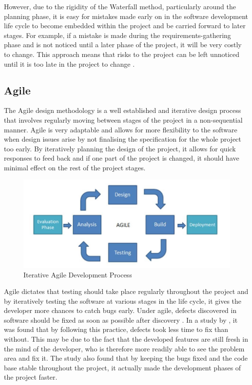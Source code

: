 However, due to the rigidity of the Waterfall method, particularly around the planning phase, it is easy for mistakes made early on in the software development life cycle to become embedded within the project and be carried forward to later stages.
For example, if a mistake is made during the requirements-gathering phase and is not noticed until a later phase of the project, it will be very costly to change.
This approach means that risks to the project can be left unnoticed until it is too late in the project to change \citep{kruchten2001waterfall}. %

\subsection{Agile}
The Agile design methodology is a well established and iterative design process that involves regularly moving between stages of the project in a non-sequential manner. 
Agile is very adaptable and allows for more flexibility to the software when design issues arise by not finalising the specification for the whole project too early.
By iteratively planning the design of the project, it allows for quick responses to feed back and if one part of the project is changed, it should have minimal effect on the rest of the project stages. 

\begin{figure}[ht]
	\centering
	\includegraphics[scale=0.4]{images/Agile_Image.jpg}
	\caption{Iterative Agile Development Process}
	\label{fig:agile}
\end{figure}

Agile dictates that testing should take place regularly throughout the project and by iteratively testing the software at various stages in the life cycle, it gives the developer more chances to catch bugs early.
Under agile, defects discovered in software should be fixed as soon as possible after discovery \citep{beck2001agile}.
In a study by \cite{talby2006}, it was found that by following this practice, defects took less time to fix than without.
This may be due to the fact that the developed features are still fresh in the mind of the developer, who is therefore more readily able to see the problem area and fix it.
The study also found that by keeping the bugs fixed and the code base stable throughout the project, it actually made the development phases of the project faster.

